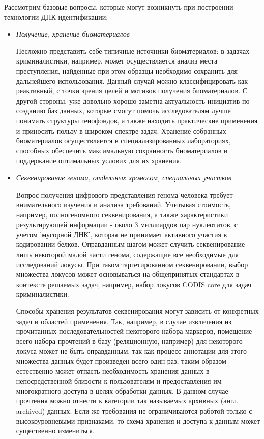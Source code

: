 Рассмотрим базовые вопросы, которые могут возникнуть при построении технологии ДНК-идентификации:
\begin{itemize}

\item \textit{Получение, хранение биоматериалов}

Несложно представить себе типичные источники биоматериалов: в задачах криминалистики, например,
может осуществляется анализ места преступления, найденные при этом образцы необходимо сохранить
для дальнейшего использования. Данный случай можно классифицировать как реактивный, с точки зрения
целей и мотивов получения биоматериалов. С другой стороны, уже довольно хорошо заметна актуальность инициатив
по созданию баз данных, которые смогут помочь исследователям лучше понимать структуры генофондов,
а также находить практические применения и приносить пользу в широком спектре задач.
Хранение собранных биоматериалов осуществляется в специализированных лабораториях,
способных обеспечить максимальную сохранность биоматериалов и поддержание оптимальных услових для
их хранения.

\item \textit{Секвенирование генома, отдельных хромосом, специальных участков}

Вопрос получения цифрового представления генома человека требует внимательного изучения и анализа
требований. Учитывая стоимость, например, полногеномного секвенирования, а также характеристики результирующей
информации - около 3 миллиардов пар нуклеотитов, с учетом 'мусорной ДНК',
которая не принимает активного участия в кодировании белков.
Оправданным шагом может случить секвенирование лишь некоторой малой части генома,
содержащие все необходимые для исследований локусы. При таком таргетированном секвенировании, выбор
множества локусов может основываться на общепринятых стандартах в контексте решаемых задач,
например, набор локусов CODIS core для задач криминалистики.

Способы хранения результатов секвенирования могут зависить от конкретных задач и областей применения.
Так, например, в случае извлечения из прочитанных последовательностей некоторого набора маркеров,
помещение всего набора прочтений в базу (реляционную, например) для некоторого локуса
может не быть оправданным, так как процесс аннотации для этого множества данных будет произведен
всего один раз, таким образом естественно может отпасть необходимость хранения данных
в непосредственной близости к пользователям и предоставления им многократного доступа в целях обработки данных.
В данном случае прочтения можно отнести к категории так называемых архивных (англ. archived) данных.
Если же требования не ограничиваются работой только с высокоуровневыми признаками,
то схема хранения и доступа к данным может существенно измениться.


\end{itemize}
